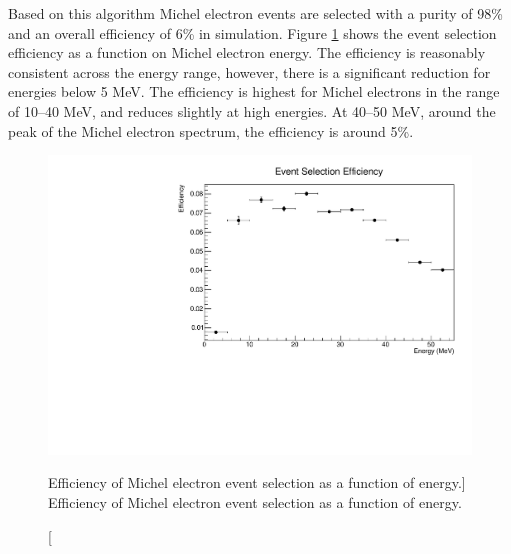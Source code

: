 Based on this algorithm Michel electron events are selected with a
purity of 98\% and an overall efficiency of 6\% in \protodune{} simulation. 
Figure \ref{fig:ev_sel_eff} shows the event selection efficiency as a 
function on Michel electron energy. The efficiency is reasonably consistent
across the energy range, however, there is a significant reduction for energies
below 5 MeV. The efficiency is highest for Michel electrons in the range of 
10--40 MeV, and reduces slightly at high energies. At 40--50 MeV, around the 
peak of the Michel electron spectrum, the efficiency is around 5\%.
\begin{figure}
	\centering
	\includegraphics[width=\textwidth, height=0.68\textwidth]{figures/eff_v_energy.pdf}
	\caption
	[Efficiency of Michel electron event selection as a function of energy.]
	{Efficiency of Michel electron event selection as a function of energy.}
	\label{fig:ev_sel_eff}
\end{figure}

